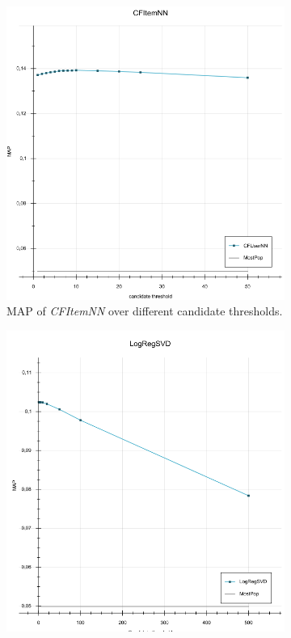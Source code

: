 \documentclass[10pt]{reportMaster}
\begin{document}
\begin{figure}[h!]
	\begin{subfigure}[c]{0.5\textwidth}
		\centering
		\includegraphics[width=1\textwidth]{figures/experiments/CFItemNNCandidates}
		\caption[MAP of \textit{CFItemNN} over different candidate thresholds]{MAP of \textit{CFItemNN} over different candidate thresholds.}
		\label{fig:CFItemNNCandidates}
	\end{subfigure}
	\begin{subfigure}[c]{0.5\textwidth}
		\centering
		\includegraphics[width=1\textwidth]{figures/experiments/LogRegSVDCandidates}

\end{subfigure}
\end{figure}
\end{document}

